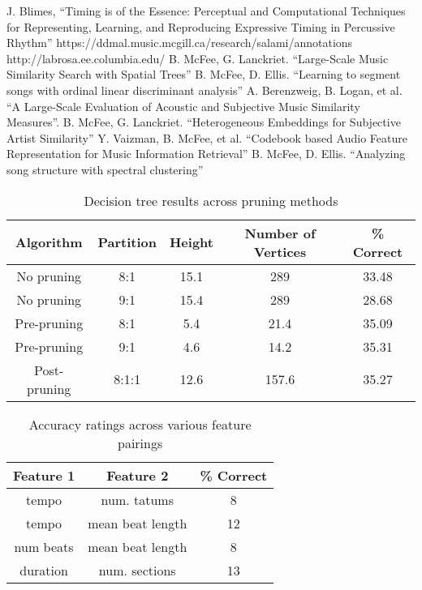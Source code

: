 \documentclass[11pt, twocolumn]{article}
\begin{document}
\begin{thebibliography}{9}
 J. Blimes, “Timing is of the Essence: Perceptual and Computational Techniques for
      Representing, Learning, and Reproducing Expressive Timing in Percussive Rhythm”
      https://ddmal.music.mcgill.ca/research/salami/annotations
      http://labrosa.ee.columbia.edu/
      B. McFee, G. Lanckriet. “Large-Scale Music Similarity Search with Spatial Trees”
      B. McFee, D. Ellis. “Learning to segment songs with ordinal linear discriminant analysis”
      A. Berenzweig, B. Logan, et al. “A Large-Scale Evaluation of Acoustic and Subjective Music Similarity Measures”.
      B. McFee, G. Lanckriet. “Heterogeneous Embeddings for Subjective Artist Similarity”
      Y. Vaizman, B. McFee, et al. “Codebook based Audio Feature Representation for Music Information Retrieval”
      B. McFee, D. Ellis. “Analyzing song structure with spectral clustering”
\end{thebibliography}

\begin{table}
  \begin{center}
    \begin{tabular}{ |c|c|c|c|c| }
      \hline
      Algorithm & Partition & Height & Number of Vertices & \% Correct \\
      \hline
      No pruning & 8:1 & 15.1 & 289 & 33.48 \\
      No pruning & 9:1 & 15.4 & 289 & 28.68 \\
      Pre-pruning & 8:1 & 5.4 & 21.4 & 35.09 \\
      Pre-pruning & 9:1 & 4.6 & 14.2 & 35.31 \\
      Post-pruning & 8:1:1 & 12.6 & 157.6 & 35.27 \\
      \hline
    \end{tabular}
  \end{center}
  \caption{Decision tree results across pruning methods}
\end{table}

\begin{table}
  \begin{center}
    \begin{tabular}{ |c|c|c| }
      \hline
      Feature 1 & Feature 2 & \% Correct \\
      \hline
      tempo & num. tatums & 8 \\
      tempo & mean beat length & 12 \\
      num beats & mean beat length & 8 \\
      duration & num. sections & 13 \\
      \hline
    \end{tabular}
  \end{center}
  \caption{Accuracy ratings across various feature pairings}
\end{table}
\end{document}
